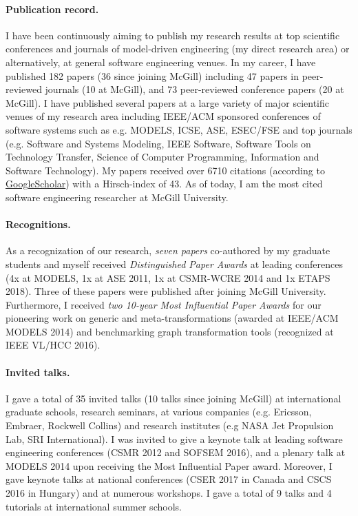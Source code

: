 \paragraph{Publication record.}
I have been continuously aiming to publish my research results at top scientific conferences and journals of model-driven engineering (my direct research area) or alternatively, at general software engineering venues. In my career, I have published 182 papers (36 since joining McGill) including 47 papers in peer-reviewed journals (10 at McGill), and 73 peer-reviewed conference papers (20 at McGill). I have published several papers at a large variety of major scientific venues of my research area including IEEE/ACM sponsored conferences of software systems such as e.g. MODELS, ICSE, ASE, ESEC/FSE and top journals (e.g. Software and Systems Modeling, IEEE Software, Software Tools on Technology Transfer, Science of Computer Programming, Information and Software Technology). My papers received over 6710 citations (according to \href{https://scholar.google.ca/citations?user=4Ya6dVoAAAAJ&hl=en}{GoogleScholar}) with a Hirsch-index of 43. As of today, I am the most cited software engineering researcher at McGill University.  

\paragraph{Recognitions.}
As a recognization of our research, \emph{seven papers} co-authored by my graduate students and myself received \emph{Distinguished Paper Awards} at leading conferences (4x at MODELS, 1x at ASE 2011, 1x at CSMR-WCRE 2014 and 1x ETAPS 2018). Three of these papers were published after joining McGill University. Furthermore, I received \emph{two 10-year Most Influential Paper Awards} for our pioneering work on generic and meta-transformations (awarded at IEEE/ACM MODELS 2014) and benchmarking graph transformation tools (recognized at IEEE VL/HCC 2016).

\paragraph{Invited talks.}
I gave a total of 35 invited talks (10 talks since joining McGill) at international graduate schools, research seminars, at various companies (e.g. Ericsson, Embraer, Rockwell Collins) and research institutes (e.g NASA Jet Propulsion Lab, SRI International). I was invited to give a keynote talk at leading software engineering conferences (CSMR 2012 and SOFSEM 2016), and a plenary talk at MODELS 2014 upon receiving the Most Influential Paper award. Moreover, I gave keynote talks at national conferences (CSER 2017 in Canada and CSCS 2016 in Hungary) and at numerous workshops. I gave a total of 9 talks and 4 tutorials at international summer schools.%

